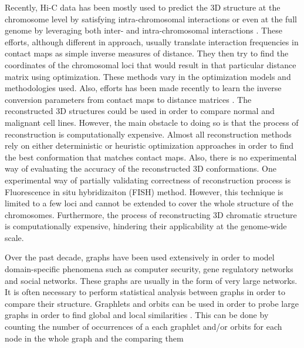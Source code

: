 \documentclass[]{article}
\begin{document}
Recently, Hi-C data has been mostly used to predict
the 3D structure at the chromosome level by satisfying
intra-chromosomal interactions or even at the
full genome by leveraging both inter- and intra-chromosomal
interactions
\cite{noble2011three, 
rousseau2011three, 
hu2013bayesian, 
varoquaux2014statistical, 
trieu2014large, 
zhang20133d, 
lesne20143d, 
bau2011three, 
adhikari2016chromosome3d}.
These efforts, although different in
approach, usually translate interaction frequencies in
contact maps as simple inverse measures of distance.
They then try to find the coordinates of the chromosomal
loci that would result in that particular distance
matrix using optimization. These methods vary in
the optimization models and methodologies used.
Also, efforts has been made recently to learn the
inverse conversion parameters from contact maps
to distance matrices \cite{oluwadare2018maximum}.
The reconstructed 3D structures could be used in
order to compare normal and malignant cell lines.
However, the main obstacle to doing so is that
the process of reconstruction is computationally expensive.
Almost all reconstruction methods rely on either
deterministic or heuristic optimization approaches in
order to find the best conformation that matches contact
maps. Also, there is no experimental way of evaluating
the accuracy of the reconstructed 3D conformations.
One experimental way of partially validating correctness
of reconstruction process is Fluorescence in
situ hybridizaiton (FISH) method. However, this
technique is limited to a few loci and cannot be
extended to cover the whole structure of the chromosomes.
Furthermore, the process of reconstructing 3D
chromatic structure is computationally expensive,
hindering their applicability at the genome-wide scale.


Over the past decade, graphs have been used extensively
in order to model domain-specific phenomena such
as computer security, gene regulatory networks and
social networks. These graphs are usually in
the form of very large networks. It is often necessary
to perform statistical analysis between graphs in
order to compare their structure. Graphlets and
orbits can be used in order to probe large graphs
in order to find global and local similarities 
\cite{shervashidze2009efficient, borgs2006counting,
bondy1977graph}.
This can be done by counting the number of occurrences
of a each graphlet and/or orbits for each node
in the whole graph and the comparing them \cite{prvzulj2007biological,
prvzulj2004modeling}
\end{document}

